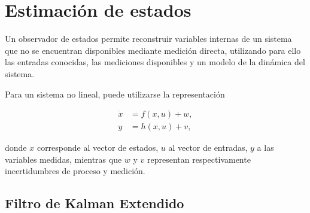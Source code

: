 %
%



\section{Estimación de estados}

%
%
%

Un observador de estados permite reconstruir variables internas de un sistema 
que no se encuentran disponibles mediante medición directa, utilizando para 
ello las entradas conocidas, las mediciones disponibles y un modelo de la 
dinámica del sistema.

Para un sistema no lineal, puede utilizarse la representación

\begin{equation}
\label{eq:sistema_no_lineal}
\begin{aligned}
\dot{x} &= f(x,u) + w,\\
y &= h(x,u) + v,
\end{aligned}
\end{equation}

donde $x$ corresponde al vector de estados, $u$ al vector de entradas, $y$ a 
las variables medidas, mientras que $w$ y $v$ representan respectivamente 
incertidumbres de proceso y medición.



\subsection{Filtro de Kalman Extendido}

